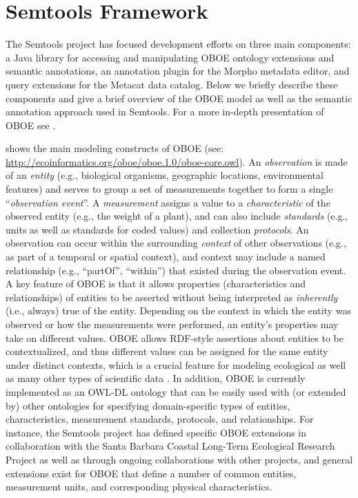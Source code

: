 \section{Semtools Framework}
\label{sec:framework}

The Semtools project has focused development efforts on three main
components: a Java library for accessing and manipulating OBOE
ontology extensions and semantic annotations, an annotation plugin for
the Morpho metadata editor, and query extensions for the Metacat data
catalog. Below we briefly describe these components and give a brief
overview of the OBOE model as well as the semantic
annotation approach used in Semtools. For a more in-depth presentation of OBOE see
\cite{madin07:_ontol_for_descr_and_synth,bowers08}.


   shows the
main modeling constructs of OBOE (see:
\url{http://ecoinformatics.org/oboe/oboe.1.0/oboe-core.owl}). An {\em
  observation} is made of an {\em entity} (e.g., biological organisms,
geographic locations, environmental features) and serves to group a
set of measurements together to form a single ``\emph{observation
  event}''. A \emph{measurement} assigns a value to a {\em
  characteristic} of the observed entity (e.g., the weight of a
plant), and can also include \emph{standards} (e.g., units as well as
standards for coded values) and collection \emph{protocols}. An
observation can occur within the surrounding \emph{context} of other
observations (e.g., as part of a temporal or spatial context), and
context may include a named relationship (e.g., ``partOf'',
``within'') that existed during the observation event. A key feature
of OBOE is that it allows properties (characteristics and
relationships) of entities to be asserted without being interpreted as
\emph{inherently} (i.e., {always}) true of the entity.  Depending on
the context in which the entity was observed or how the measurements
were performed, an entity's properties may take on different values.
OBOE allows RDF-style assertions about entities to be contextualized,
and thus different values can be assigned for the same entity under
distinct contexts, which is a crucial feature for modeling ecological
as well as many other types of scientific data
\cite{bowers08,mungall07:_repres_phenot_in_owl}. In addition, OBOE is
currently implemented as an OWL-DL ontology that can be easily used
with (or extended by) other ontologies for specifying domain-specific
types of entities, characteristics, measurement standards, protocols,
and relationships. For instance, the Semtools project has defined
specific OBOE extensions in collaboration with the Santa Barbara
Coastal Long-Term Ecological Research Project as well as through
ongoing collaborations with other projects, and general extensions
exist for OBOE that define a number of common entities, measurement
units, and corresponding physical characteristics.

